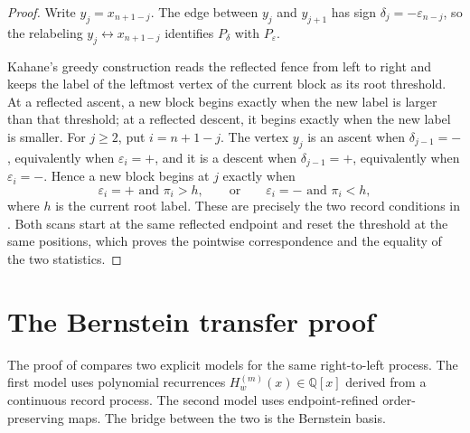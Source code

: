 \documentclass[10pt,a4paper]{amsart}
\newtheorem{example}[theorem]{Example}
\DeclareMathOperator{\rec}{rec}
\DeclareMathOperator{\zzrec}{zzrec}
\newcommand{\eps}{\varepsilon}
\begin{document}
\begin{proof}
Write \(y_j=x_{n+1-j}\).  The edge between \(y_j\) and \(y_{j+1}\) has sign
\(\delta_j=-\eps_{n-j}\), so the relabeling \(y_j\leftrightarrow x_{n+1-j}\)
identifies \(P_\delta\) with \(P_\eps\).

Kahane's greedy construction reads the reflected fence from left to right and
keeps the label of the leftmost vertex of the current block as its root
threshold.  At a reflected ascent, a new block begins exactly when the new
label is larger than that threshold; at a reflected descent, it begins exactly
when the new label is smaller.  For \(j\ge2\), put \(i=n+1-j\).  The vertex
\(y_j\) is an ascent when \(\delta_{j-1}=-\), equivalently when
\(\eps_i=+\), and it is a descent when \(\delta_{j-1}=+\), equivalently when
\(\eps_i=-\).  Hence a new block begins at \(j\) exactly when
\[
\eps_i=+\text{ and }\pi_i>h,
\qquad\text{or}\qquad
\eps_i=-\text{ and }\pi_i<h,
\]
where \(h\) is the current root label.  These are precisely the two record
conditions in .  Both scans start at the
same reflected endpoint and reset the threshold at the same positions, which
proves the pointwise correspondence and the equality of the two statistics.
\end{proof}


\section{The Bernstein transfer proof}\label{sec:bernstein-proof}

The proof of  compares two explicit models for the same
right-to-left process.  The first model uses polynomial recurrences
\(H_w^{(m)}(x)\in\mathbb Q[x]\) derived from a continuous record process.  The
second model uses endpoint-refined order-preserving maps.  The bridge between
the two is the Bernstein basis.
\end{document}

